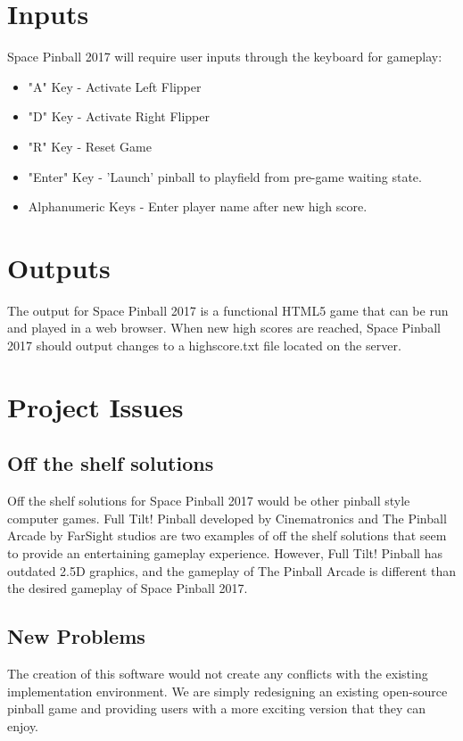 \documentclass[12pt]{article}
\begin{document}
\section{Inputs}

Space Pinball 2017 will require user inputs through the keyboard for gameplay:

\begin{itemize}
\item "A" Key - Activate Left Flipper
\item "D" Key - Activate Right Flipper
\item "R" Key - Reset Game
\item "Enter" Key - 'Launch' pinball to playfield from pre-game waiting state.
\item Alphanumeric Keys - Enter player name after new high score.

\end{itemize}	
	
\section{Outputs}

The output for Space Pinball 2017 is a functional HTML5 game that can be run and played in a web browser. When new high scores are reached, Space Pinball 2017 should output changes to a highscore.txt file located on the server.
	
	
\section{Project Issues}

\subsection{Off the shelf solutions}

Off the shelf solutions for Space Pinball 2017 would be other pinball style computer games. Full Tilt! Pinball developed by Cinematronics and The Pinball Arcade by FarSight studios are two examples of off the shelf solutions that seem to provide an entertaining gameplay experience. However, Full Tilt! Pinball has outdated 2.5D graphics, and the gameplay of The Pinball Arcade is different than the desired gameplay of Space Pinball 2017. 


\subsection{New Problems}
The creation of this software would not create any conflicts with the existing implementation environment. We are simply redesigning an existing open-source pinball game and providing users with a more exciting version that they can enjoy.
\end{document}

